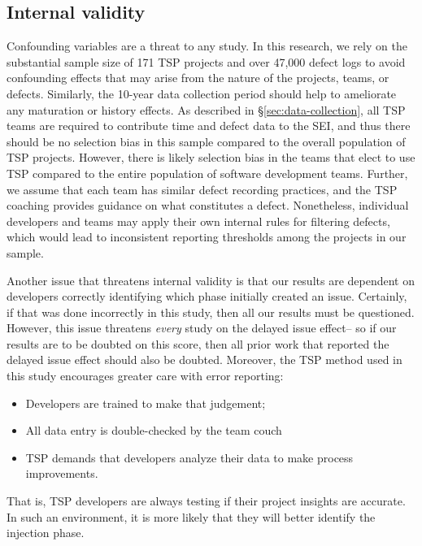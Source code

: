 \documentclass{sig-alternate}
\newcommand{\bi}{\begin{itemize}}%
\newcommand{\ei}{\end{itemize}}
\begin{document}
\subsection{Internal validity}
Confounding variables are a threat to any study. In this research, we rely on the substantial sample size of 171 TSP projects and over 47,000 defect logs to avoid confounding effects that may arise from the nature of the projects, teams, or defects. Similarly, the 10-year data collection period should help to ameliorate any maturation or history effects.  As described in \S\ref{sec:data-collection}, all TSP teams are required to contribute time and defect data to the SEI, and thus there should be no selection bias in this sample compared to the overall population of TSP projects. However, there is likely selection bias in the teams that elect to use TSP compared to the entire population of software development teams. Further, we assume that each team has similar defect recording practices, and the TSP coaching provides guidance on what constitutes a defect. Nonetheless, individual developers and teams may apply their own internal rules for filtering defects, which would lead to inconsistent reporting thresholds among the projects in our sample.

Another issue that threatens internal validity is that our
results are dependent on developers correctly identifying which
phase initially created an issue. Certainly, if that was done
incorrectly in this study, then all our results must be questioned.
However,  this issue threatens {\em every} study on the delayed
issue effect-- so if our results are to be doubted on this score,
then all prior work that reported the delayed issue effect should
also be doubted. Moreover, the TSP method used in this study
encourages greater care with error reporting:


\bi
\item Developers are trained   to make that judgement;
\item All data entry is double-checked by the team couch 
\item TSP demands that developers analyze their data to make
process improvements. 
\ei
That is, TSP developers are always testing
if their project insights are accurate. In such an environment,
it is more likely that they will better identify the injection phase.

 
\end{document}
